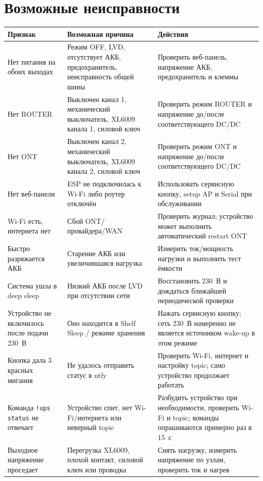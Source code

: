 \documentclass[11pt,a4paper]{article}
\begin{document}
\section{Возможные неисправности}
\begin{longtable}{@{}p{38mm}p{48mm}p{74mm}@{}}
\toprule
\textbf{Признак} & \textbf{Возможная причина} & \textbf{Действия} \\
\midrule
\endhead
Нет питания на обоих выходах & Режим OFF, LVD, отсутствует АКБ, предохранитель, неисправность общей шины & Проверить веб-панель, напряжение АКБ, предохранитель и клеммы \\
Нет ROUTER & Выключен канал 1, механический выключатель, XL6009 канала 1, силовой ключ & Проверить режим ROUTER и напряжение до/после соответствующего DC/DC \\
Нет ONT & Выключен канал 2, механический выключатель, XL6009 канала 2, силовой ключ & Проверить режим ONT и напряжение до/после соответствующего DC/DC \\
Нет веб-панели & ESP не подключилась к Wi-Fi либо роутер отключён & Использовать сервисную кнопку, setup AP и Serial при обслуживании \\
Wi-Fi есть, интернета нет & Сбой ONT/провайдера/WAN & Проверить журнал; устройство может выполнить автоматический restart ONT \\
Быстро разряжается АКБ & Старение АКБ или увеличившаяся нагрузка & Измерить ток/мощность нагрузки и выполнить тест ёмкости \\
Система ушла в deep sleep & Низкий АКБ после LVD при отсутствии сети & Восстановить 230~В и дождаться ближайшей периодической проверки \\
Устройство не включилось после подачи 230~В & Оно находится в Shelf Sleep / режиме хранения & Нажать сервисную кнопку; сеть 230~В намеренно не является источником wake-up в этом режиме \\
Кнопка дала 3 красных мигания & Не удалось отправить статус в ntfy & Проверить Wi-Fi, интернет и настройку topic; само устройство продолжает работать \\
Команда \texttt{!ups status} не отвечает & Устройство спит, нет Wi-Fi/интернета или неверный topic & Разбудить устройство при необходимости, проверить Wi-Fi и topic; команды опрашиваются примерно раз в 15~с \\
Выходное напряжение проседает & Перегрузка XL6009, плохой контакт, силовой ключ или проводка & Снять нагрузку, измерить напряжение по узлам, проверить ток и нагрев \\
\bottomrule
\end{longtable}
\end{document}
